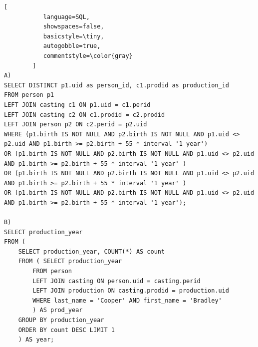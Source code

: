 \documentclass{article}
\begin{document}
\begin{lstlisting}[
           language=SQL,
           showspaces=false,
           basicstyle=\tiny,
           autogobble=true,
           commentstyle=\color{gray}
        ]
A)
SELECT DISTINCT p1.uid as person_id, c1.prodid as production_id
FROM person p1
LEFT JOIN casting c1 ON p1.uid = c1.perid
LEFT JOIN casting c2 ON c1.prodid = c2.prodid
LEFT JOIN person p2 ON c2.perid = p2.uid
WHERE (p1.birth IS NOT NULL AND p2.birth IS NOT NULL AND p1.uid <> p2.uid AND p1.birth >= p2.birth + 55 * interval '1 year')
OR (p1.birth IS NOT NULL AND p2.birth IS NOT NULL AND p1.uid <> p2.uid AND p1.birth >= p2.birth + 55 * interval '1 year' )
OR (p1.birth IS NOT NULL AND p2.birth IS NOT NULL AND p1.uid <> p2.uid AND p1.birth >= p2.birth + 55 * interval '1 year' )
OR (p1.birth IS NOT NULL AND p2.birth IS NOT NULL AND p1.uid <> p2.uid AND p1.birth >= p2.birth + 55 * interval '1 year');

B)
SELECT production_year
FROM (
	SELECT production_year, COUNT(*) AS count
	FROM ( SELECT production_year
		FROM person
		LEFT JOIN casting ON person.uid = casting.perid
		LEFT JOIN production ON casting.prodid = production.uid
		WHERE last_name = 'Cooper' AND first_name = 'Bradley'
		) AS prod_year
	GROUP BY production_year
	ORDER BY count DESC LIMIT 1
	) AS year;


\end{lstlisting}
\end{document}
